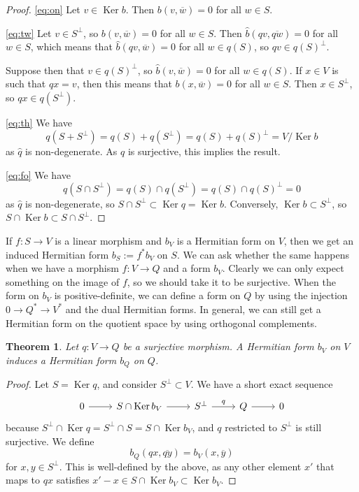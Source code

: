 \documentclass[10pt,a4paper]{amsart}
\newtheorem{theo}{Theorem}[section]
\theoremstyle{definition}
\def\ov#1{\overline{#1}}
\DeclareMathOperator{\Ker}{Ker}
\begin{document}
\begin{proof}
\eqref{eq:on}\quad
Let $v \in \Ker b$. Then $b(v, \ov w) = 0$ for all $w \in S$.

\eqref{eq:tw}\quad
Let $v \in S^\perp$, so $b(v, \ov w) = 0$ for all $w \in S$. Then $\hat b(qv,
\ov{qw}) = 0$ for all $w \in S$, which means that $\hat b(qv, \ov w) = 0$ for
all $w \in q(S)$, so $qv \in q(S)^\perp$.

Suppose then that $v \in q(S)^\perp$, so $\hat b(v, \ov w) = 0$ for all $w \in
q(S)$. If $x \in V$ is such that $qx = v$, then this means that $b(x, \ov w) =
0$ for all $w \in S$. Then $x \in S^\perp$, so $qx \in q(S^\perp)$.

\eqref{eq:th}\quad
We have
\[
q(S + S^\perp)
= q(S) + q(S^\perp)
= q(S) + q(S)^\perp
= V / \Ker b
\]
as $\hat q$ is non-degenerate. As $q$ is surjective, this implies the result.

\eqref{eq:fo}\quad
We have
\[
q(S \cap S^\perp)
= q(S) \cap q(S^\perp)
= q(S) \cap q(S)^\perp
= 0
\]
as $\hat q$ is non-degenerate,
so $S \cap S^\perp \subset \Ker q = \Ker b$. Conversely, $\Ker b \subset S^\perp$, so $S \cap \Ker b \subset S \cap S^\perp$.
\end{proof}


If $f : S \to V$ is a linear morphism and $b_V$ is a Hermitian form on $V$, then
we get an induced Hermitian form $b_S := f^*b_V$ on $S$. We can ask whether the
same happens when we have a morphism $f : V \to Q$ and a form $b_V$. Clearly we
can only expect something on the image of $f$, so we should take it to be
surjective. When the form on $b_V$ is positive-definite, we can define a form on
$Q$ by using the injection $0 \to Q^* \to V^*$ and the dual Hermitian forms. In
general, we can still get a Hermitian form on the quotient space by using
orthogonal complements.


\begin{theo}
Let $q : V \to Q$ be a surjective morphism. A Hermitian form $b_V$ on $V$ induces a Hermitian form $b_Q$ on $Q$.
\end{theo}

\begin{proof}
Let $S = \Ker q$, and consider $S^\perp \subset V$. We have a short exact sequence
\[
\begin{tikzcd}
0 \ar[r] &
S \cap \Ker b_V \ar[r] &
S^\perp \ar[r,"q"] &
Q \ar[r] &
0
\end{tikzcd}
\]
because $S^\perp \cap \Ker q = S^\perp \cap S = S \cap \Ker b_V$, and $q$ restricted to $S^\perp$ is still surjective. We define
\[
b_Q(qx, \ov{qy})
= b_V(x, \ov y)
\]
for $x, y \in S^\perp$. This is well-defined by the above, as any other element $x'$ that maps to $qx$ satisfies $x' - x \in S \cap \Ker b_V \subset \Ker b_V$.
\end{proof}
\end{document}
